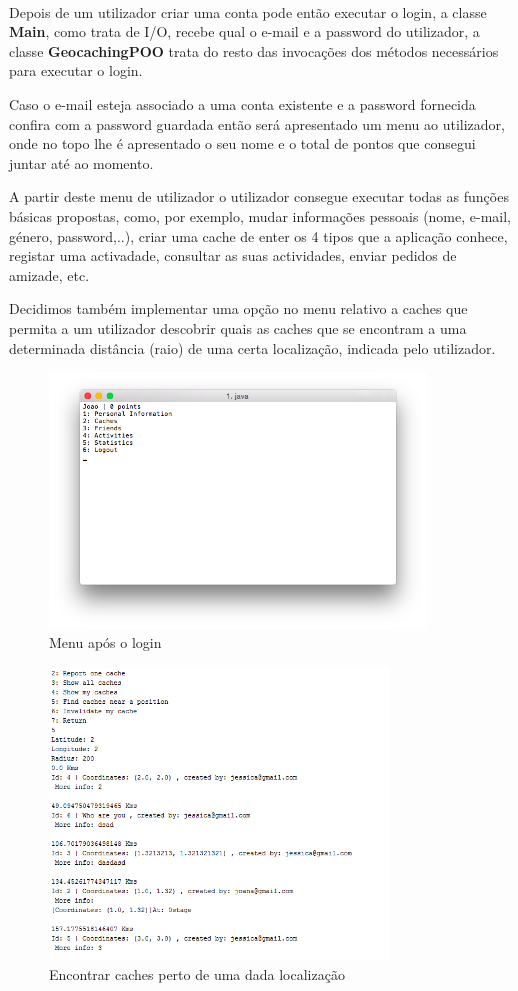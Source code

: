 \documentclass{article}
\begin{document}
\\
\par Depois de um utilizador criar uma conta pode então executar o login, a classe \textbf{Main}, como trata de I/O, recebe qual
o e-mail e a password do utilizador, a classe \textbf{GeocachingPOO} trata do resto das invocações dos métodos necessários
para executar o login.
\par Caso o e-mail esteja associado a uma conta existente e a password fornecida confira com a password guardada então
será apresentado um menu ao utilizador, onde no topo lhe é apresentado o seu nome e o total de pontos que consegui juntar
até ao momento.
\par A partir deste menu de utilizador o utilizador consegue executar todas as funções básicas propostas, como, por exemplo,
mudar informações pessoais (nome, e-mail, género, password,..), criar uma cache de enter os 4 tipos que a aplicação
conhece, registar uma activadade, consultar as suas actividades, enviar pedidos de amizade, etc.
\par Decidimos também implementar uma opção no menu relativo a caches que permita a um utilizador descobrir quais as
caches que se encontram a uma determinada distância (raio) de uma certa localização, indicada pelo utilizador. \\
\begin{figure}[ht!]
\centering
\includegraphics[width=100mm]{login.png}
\caption{Menu após o login}

\end{figure}
\begin{figure}[ht!]
\centering
\includegraphics[width=90mm]{getNearCaches.png}
\caption{Encontrar caches perto de uma dada localização}
\end{figure}
\newpage
\end{document}
